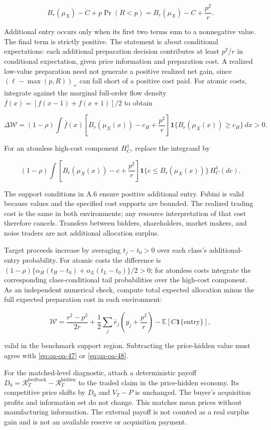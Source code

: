 \documentclass[
  11pt,
]{article}
\begin{document}
\[
B_r(\mu_X)-C+p\Pr(R<p)=B_r(\mu_X)-C+\frac{p^2}{r}.
\tag{OA.46}\label{eq:oa-oa-46}
\]

Additional entry occurs only when its first two terms sum to a
nonnegative value. The final term is strictly positive. The statement is
about conditional expectations: each additional preparation decision
contributes at least \(p^2/r\) in conditional expectation, given price
information and preparation cost. A realized low-value preparation need
not generate a positive realized net gain, since \((\ell-\max(p,R))_+\)
can fall short of a positive cost paid. For atomic costs, integrate against the
marginal full-order flow density \(\bar f(x)=[f(x-1)+f(x+1)]/2\) to obtain

\[
\Delta\mathcal W=(1-\rho)\int \bar f(x)
\left[B_r(\mu_X(x))-c_H+\frac{p^2}{r}\right]
\mathbf1\{B_r(\mu_X(x))\ge c_H\}\,dx>0.
\tag{OA.47}\label{eq:oa-oa-47}
\]

For an atomless high-cost component \(H_C^1\), replace the integrand by

\[
(1-\rho)\int\left[B_r(\mu_X(x))-c+\frac{p^2}{r}\right]
\mathbf1\{c\le B_r(\mu_X(x))\}\,H_C^1(dc).
\tag{OA.48}\label{eq:oa-oa-48}
\]

The support conditions in A.6 ensure positive additional entry. Fubini
is valid because values and the specified cost supports are bounded. The
realized trading cost is the same in both environments; any resource
interpretation of that cost therefore cancels. Transfers between
bidders, shareholders, market makers, and noise traders are not
additional allocation surplus.

Target proceeds increase by averaging \(t_j-t_0>0\) over each
class's additional-entry probability. For atomic costs the difference is
\((1-\rho)\{\alpha_H(t_H-t_0)+\alpha_L(t_L-t_0)\}/2>0\); for atomless
costs integrate the corresponding class-conditional tail probabilities over
the high-cost component. As an independent numerical check, compute
total expected allocation minus the full expected preparation cost in
each environment:

\[
\mathcal W=\frac{r^2-p^2}{2r}
+\frac12\sum_j\bar e_j\left(g_j+\frac{p^2}{r}\right)
-\mathbb E[C\mathbf1\{\text{entry}\}],
\tag{OA.49}\label{eq:oa-oa-49}
\]

valid in the benchmark support region. Subtracting the price-hidden
value must agree with \eqref{eq:oa-oa-47} or \eqref{eq:oa-oa-48}.

For the matched-level diagnostic, attach a deterministic payoff
\(D_0=\mathcal R_T^{\mathrm{feedback}}-\mathcal R_T^{\mathrm{hidden}}\)
to the traded claim in the price-hidden economy. Its competitive price
shifts by \(D_0\) and \(V_T-P\) is unchanged. The buyer's acquisition
profits and information set do not change. This matches mean prices
without manufacturing information. The external payoff is not counted as
a real surplus gain and is not an available reserve or acquisition
payment.
\end{document}
